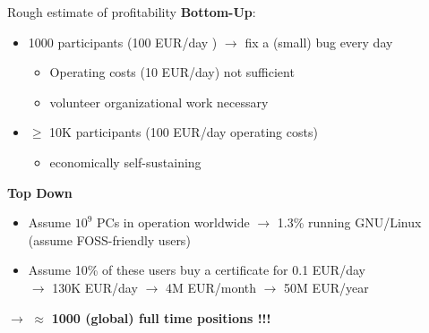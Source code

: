 \documentclass[t]{beamer}
\newcommand{\cst}[1]{{\usebeamercolor[fg]{structure}#1}}
\begin{document}
\begin{frame}[label=cm90]{\cst{Rough estimate of profitability}}
\textbf{Bottom-Up}:
\begin{itemize}
 \item 1000 participants (100 EUR/day ) $\rightarrow$ fix a (small) bug every day
 \pause
 \begin{itemize}
 \item Operating costs (10 EUR/day) not sufficient
 \item volunteer organizational work necessary
 \end{itemize}
 \pause
 \item $\geq$ 10K participants (100 EUR/day operating costs)
 \begin{itemize}
  \item economically self-sustaining
 \end{itemize}

\end{itemize}

\pause
\bigskip
\textbf{Top Down}
\begin{itemize}
 \item Assume $10^9$ PCs in operation worldwide $\rightarrow$ 1.3\% running GNU/Linux
 \\ \hfill(assume FOSS-friendly users)
 \item Assume 10\% of these users buy a certificate for 0.1 EUR/day\\
 \pause
 $\rightarrow$ 130K EUR/day $\rightarrow$ 4M EUR/month $\rightarrow$ 50M EUR/year\\
\end{itemize}
 \pause
\begin{center}
$\rightarrow$ $\approx$ \textbf{1000 {\footnotesize (global)} full time positions \pause!!!}
\end{center}
\end{frame}
\end{document}
